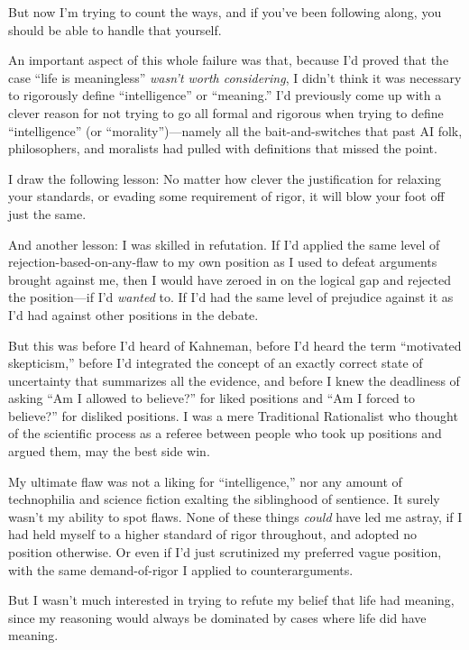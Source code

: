 {
 But now I'm trying to count the ways, and if
you've been following along, you should be able to
handle that yourself.}

{
 An important aspect of this whole failure was that, because
I'd proved that the case ``life is
meaningless'' \textit{wasn't worth
considering}, I didn't think it was necessary to
rigorously define ``intelligence''
or ``meaning.'' I'd
previously come up with a clever reason for not trying to go all formal
and rigorous when trying to define
``intelligence'' (or
``morality'')---namely all the
bait-and-switches that past AI folk, philosophers, and moralists had
pulled with definitions that missed the point.}

{
 I draw the following lesson: No matter how clever the
justification for relaxing your standards, or evading some requirement
of rigor, it will blow your foot off just the same.}

{
 And another lesson: I was skilled in refutation. If
I'd applied the same level of
rejection-based-on-any-flaw to my own position as I used to defeat
arguments brought against me, then I would have zeroed in on the
logical gap and rejected the position---if I'd
\textit{wanted} to. If I'd had the same level of
prejudice against it as I'd had against other positions
in the debate.}

{
 But this was before I'd heard of Kahneman, before
I'd heard the term ``motivated
skepticism,'' before I'd integrated
the concept of an exactly correct state of uncertainty that summarizes
all the evidence, and before I knew the deadliness of asking
``Am I allowed to believe?'' for
liked positions and ``Am I forced to
believe?'' for disliked positions. I was a mere
Traditional Rationalist who thought of the scientific process as a
referee between people who took up positions and argued them, may the
best side win.}

{
 My ultimate flaw was not a liking for
``intelligence,'' nor any amount of
technophilia and science fiction exalting the siblinghood of sentience.
It surely wasn't my ability to spot flaws. None of
these things \textit{could} have led me astray, if I had held myself to
a higher standard of rigor throughout, and adopted no position
otherwise. Or even if I'd just scrutinized my preferred
vague position, with the same demand-of-rigor I applied to
counterarguments.}

{
 But I wasn't much interested in trying to refute
my belief that life had meaning, since my reasoning would always be
dominated by cases where life did have meaning.}


